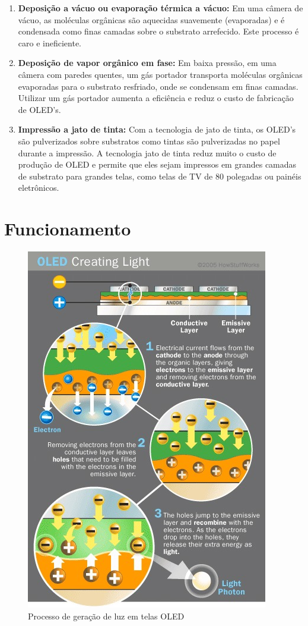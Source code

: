 \begin{enumerate}
	\item {\bf Deposição a vácuo ou evaporação térmica a vácuo:} Em uma câmera de vácuo, as moléculas orgânicas são aquecidas suavemente (evaporadas) e é condensada como finas camadas sobre o substrato arrefecido. Este processo é caro e ineficiente.

	\item {\bf Deposição de vapor orgânico em fase:} Em baixa pressão, em uma câmera com paredes quentes, um gás portador transporta moléculas orgânicas evaporadas para o substrato resfriado, onde se condensam em finas camadas. Utilizar um gás portador aumenta a eficiência e reduz o custo de fabricação de OLED's.

	\item {\bf Impressão a jato de tinta:} Com a tecnologia de jato de tinta, os OLED's são pulverizados sobre substratos como tintas são pulverizadas no papel durante a impressão. A tecnologia jato de tinta reduz muito o custo de produção de OLED e permite que eles sejam impressos em grandes camadas de substrato para grandes telas, como telas de TV de 80 polegadas ou painéis eletrônicos.
\end{enumerate}


\section{Funcionamento}
\label{sec:funcionamento}

\begin{figure}[!h]
  \centering
  \includegraphics[width=.40\textwidth]{./figuras/oled-process} 
  \caption{Processo de geração de luz em telas OLED}
  \label{fig:oled-process} 
\end{figure}

